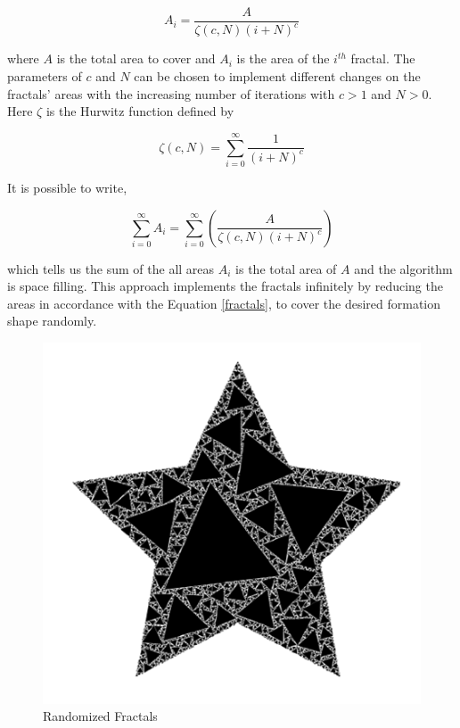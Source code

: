 \begin{equation} \label{fractals}
A_i = \frac{A}{\zeta(c,N)(i+N)^c}
\end{equation}

where $A$ is the total area to cover and $A_i$ is the area of the $i^{th}$ fractal. The parameters of $c$ and $N$ can be chosen to implement different changes on the fractals' areas with the increasing number of iterations with $c>1$ and $N>0$. Here  $\zeta$ is the Hurwitz function defined by

\begin{equation}
\zeta(c,N) = \sum_{i=0}^{\infty} \frac{1}{(i+N)^c}
\end{equation}

It is possible to write, 
	
\begin{equation}
\sum_{i=0}^{\infty}A_i = \sum_{i = 0}^{\infty}\left(\frac{A}{\zeta(c,N)(i+N)^c}\right)
\end{equation}
	
which tells us the sum of the all areas $A_i$ is the total area of $A$ and the algorithm is space filling. This approach implements the fractals infinitely by reducing the areas in accordance with the Equation \ref{fractals}, to cover the desired formation shape randomly. 

\begin{figure}[H]
\caption{Randomized Fractals \cite{26}}
\centering
\includegraphics[scale = 0.70]{randomized}
\end{figure}
	
